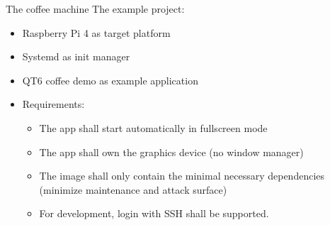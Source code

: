 \documentclass{beamer}
\begin{document}
\begin{frame}{The coffee machine}
	The example project:
	\begin{itemize}
		\item Raspberry Pi 4 as target platform
		\item Systemd as init manager
		\item QT6 coffee demo as example application
		\item Requirements:
		\begin{itemize}
			\item The app shall start automatically in fullscreen mode
			\item The app shall own the graphics device (no window manager)
			\item The image shall only contain the minimal necessary dependencies (minimize maintenance and attack surface)
			\item For development, login with SSH shall be supported.
		\end{itemize}
	\end{itemize}
\end{frame}
\end{document}
